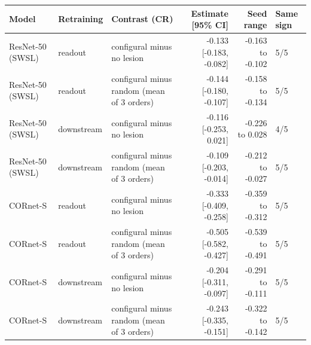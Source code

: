 \begin{tabular}{lllrrl}
\hline
Model & Retraining & Contrast (CR) & Estimate [95\% CI] & Seed range & Same sign \\
\hline
ResNet-50 (SWSL) & readout & configural minus no lesion & -0.133 [-0.183, -0.082] & -0.163 to -0.102 & 5/5 \\
ResNet-50 (SWSL) & readout & configural minus random (mean of 3 orders) & -0.144 [-0.180, -0.107] & -0.158 to -0.134 & 5/5 \\
ResNet-50 (SWSL) & downstream & configural minus no lesion & -0.116 [-0.253, 0.021] & -0.226 to 0.028 & 4/5 \\
ResNet-50 (SWSL) & downstream & configural minus random (mean of 3 orders) & -0.109 [-0.203, -0.014] & -0.212 to -0.027 & 5/5 \\
CORnet-S & readout & configural minus no lesion & -0.333 [-0.409, -0.258] & -0.359 to -0.312 & 5/5 \\
CORnet-S & readout & configural minus random (mean of 3 orders) & -0.505 [-0.582, -0.427] & -0.539 to -0.491 & 5/5 \\
CORnet-S & downstream & configural minus no lesion & -0.204 [-0.311, -0.097] & -0.291 to -0.111 & 5/5 \\
CORnet-S & downstream & configural minus random (mean of 3 orders) & -0.243 [-0.335, -0.151] & -0.322 to -0.142 & 5/5 \\
\hline
\end{tabular}